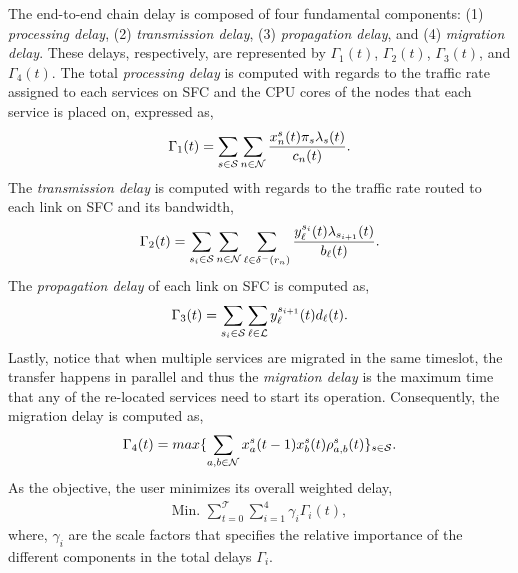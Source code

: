 The end-to-end chain delay is composed of four fundamental components: (1) \emph{processing delay}, (2)  \emph{transmission delay}, (3) \emph{propagation delay}, and (4) \emph{migration delay}. These delays, respectively, are represented by $\Gamma_{1}(t)$, $\Gamma_{2}(t)$, $\Gamma_{3}(t)$, and $\Gamma_{4}(t)$.
The total \emph{processing delay} is computed with regards to the traffic rate assigned to each services on SFC and the CPU cores of the nodes that each service is placed on, expressed as, 
\begin{gather}
	\Gamma_{1}(t) = \sum_{s\in\mathcal{S}} 
	\sum_{n\in\mathcal{N}} 
	\frac{x_{n}^{s}(t)\pi_{s}\lambda_{s}(t)}{c_{n}(t)}.
\end{gather}
The \emph{transmission delay} is computed with regards to the traffic rate routed to each link on SFC and its bandwidth,
\begin{gather}
	\Gamma_{2}(t) = \sum_{s_{i}\in\mathcal{S}} 
	\sum_{n\in\mathcal{N}} 
	\sum_{\ell\in \delta^{-}(r_n)} 
	\frac{y_{\ell}^{s_{i}}(t)\lambda_{s_{i+1}}(t)}{b_{\ell}(t)}.
\end{gather}
The \emph{propagation delay} of each link on SFC is computed as,
\begin{gather}
	\Gamma_{3}(t) = \sum_{s_{i}\in\mathcal{S}}
	\sum_{\ell\in\mathcal{L}} 
	y_{\ell}^{s_{i+1}}(t)d_{\ell}(t).
\end{gather}
Lastly, notice that when multiple services are migrated in the same timeslot, the transfer happens in parallel and thus the \emph{migration delay} is the maximum time that any of the re-located services need to start its operation. Consequently, the migration delay is computed as,
\begin{gather}
	\Gamma_{4}(t) = max\{
	\sum_{a,b\in\mathcal{N}}
	x_{a}^{s}(t-1)x_{b}^{s}(t)\rho_{a,b}^{s}(t)\}_{s\in\mathcal{S}}.
\end{gather}
As the objective, the user minimizes its overall weighted delay,
\begin{gather}
	\text{Min. }\sum_{t=0}^{\mathcal{T}} \sum_{i=1}^{4} \gamma_{i}\Gamma_{i}(t),
	\label{linearized obj}
\end{gather}
where, $\gamma_{i}$ are the scale factors that specifies the relative importance of the different components in the total delays $\Gamma_{i}$.





